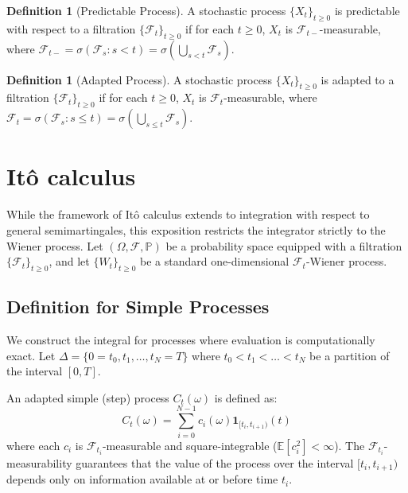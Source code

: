 \documentclass[11pt]{amsart}
\theoremstyle{plain}
\theoremstyle{definition}
\newtheorem{definition}[theorem]{Definition}
\theoremstyle{remark}
\numberwithin{equation}{section}
\begin{document}
{

\begin{definition}[Predictable Process]
    A stochastic process $\{X_t\}_{t \geq 0}$ is predictable with respect to a filtration $\{\mathcal{F}_t\}_{t \geq 0}$ if for each $t \geq 0$, $X_t$ is $\mathcal{F}_{t-}$-measurable, where $\mathcal{F}_{t-} = \sigma(\mathcal{F}_s : s < t) = \sigma \left(\bigcup_{s < t} \mathcal{F}_s \right)$.
\end{definition}

\begin{definition}[Adapted Process]
    A stochastic process $\{X_t\}_{t \geq 0}$ is adapted to a filtration $\{\mathcal{F}_t\}_{t \geq 0}$ if for each $t \geq 0$, $X_t$ is $\mathcal{F}_t$-measurable, where $\mathcal{F}_t = \sigma(\mathcal{F}_s : s \leq t) = \sigma \left(\bigcup_{s \leq t} \mathcal{F}_s \right)$.
\end{definition}


\section{It\^{o} calculus}
\label{app:C}

While the framework of Itô calculus extends to integration with respect to general semimartingales, this exposition restricts the integrator strictly to the Wiener process.
Let $(\Omega, \mathcal{F}, \mathbb{P})$ be a probability space equipped with a filtration $\{\mathcal{F}_t\}_{t \ge 0}$, and let $\{W_t\}_{t \ge 0}$ be a standard one-dimensional $\mathcal{F}_t$-Wiener process. 

\subsection{Definition for Simple Processes}
We construct the integral for processes where evaluation is computationally exact. Let $\Delta = \{0 = t_0, t_1,\dots,t_N = T\}$ where $t_0 < t_1< \dots < t_N$ be a partition of the interval $[0, T]$. 

An adapted simple (step) process $C_t(\omega)$ is defined as:
\begin{equation}
    C_t(\omega) = \sum_{i=0}^{N-1} c_i(\omega) \mathbf{1}_{[t_i, t_{i+1})}(t)
\end{equation}
where each $c_i$ is $\mathcal{F}_{t_i}$-measurable and square-integrable ($\mathbb{E}[c_i^2] < \infty$). The $\mathcal{F}_{t_i}$-measurability guarantees that the value of the process over the interval $[t_i, t_{i+1})$ depends only on information available at or before time $t_i$.

}
\end{document}
